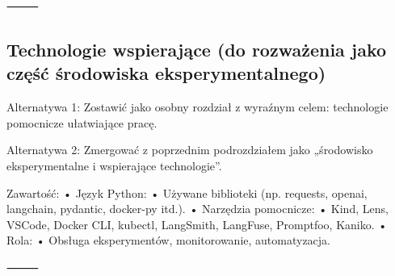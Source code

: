 ⸻

\subsection{Technologie wspierające (do rozważenia jako część środowiska eksperymentalnego)}

Alternatywa 1: Zostawić jako osobny rozdział z wyraźnym celem: technologie pomocnicze ułatwiające pracę.

Alternatywa 2: Zmergować z poprzednim podrozdziałem jako „środowisko eksperymentalne i wspierające technologie”.

Zawartość:
	•	Język Python:
	•	    Używane biblioteki (np. requests, openai, langchain, pydantic, docker-py itd.).
	•	Narzędzia pomocnicze:
	•	    Kind, Lens, VSCode, Docker CLI, kubectl, LangSmith, LangFuse, Promptfoo, Kaniko.
	•	Rola:
	•	    Obsługa eksperymentów, monitorowanie, automatyzacja.

⸻
